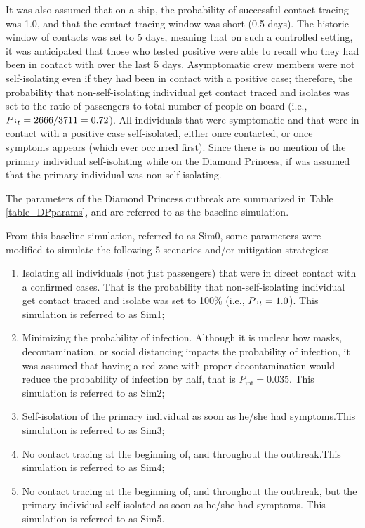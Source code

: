 \documentclass[sr]{drdc-report}
\def\Pinf{\ensuremath{P_\mathrm{inf}}}
\def\Pit{\ensuremath{P_{{\hspace{0.25em}}^\mathrm{i}t}}}
\begin{document}
It was also assumed that on a ship, the probability of successful contact tracing was 1.0, and that the contact tracing window was short (0.5 days). The historic window of contacts was set to 5 days, meaning that on such a controlled setting, it was anticipated that those who tested positive were able to recall who they had been in contact with over the last 5 days. Asymptomatic crew members were not self-isolating even if they had been in contact with a positive case; therefore, the probability that non-self-isolating individual get contact traced and isolates was set to the ratio of passengers to total number of people on board (i.e., $\Pit = 2666/3711 = 0.72$).  All individuals that were symptomatic and that were in contact with a positive case self-isolated, either once contacted, or once symptoms appears (which ever occurred first). Since there is no mention of the primary individual self-isolating while on the Diamond Princess, if was assumed that the primary individual was non-self isolating. 

The parameters of the Diamond Princess outbreak are summarized in Table \ref{table_DPparams}, and are referred to as the baseline simulation. 

From this baseline simulation, referred to as Sim0, some parameters were modified to simulate the following 5 scenarios and/or mitigation strategies:
\begin{enumerate}
\item Isolating all individuals (not just passengers) that were in direct contact with a confirmed cases. That is the probability that non-self-isolating individual get contact traced and isolate was set to 100\% (i.e., $\Pit = 1.0$). This simulation is referred to as Sim1;
\item Minimizing the probability of infection. Although it is unclear how masks, decontamination, or social distancing impacts the probability of infection, it was assumed that having a red-zone with proper decontamination would reduce the probability of infection by half, that is $\Pinf = 0.035$. This simulation is referred to as Sim2;
\item Self-isolation of the primary individual as soon as he/she had symptoms.This simulation is referred to as Sim3;
\item No contact tracing at the beginning of, and throughout the outbreak.This simulation is referred to as Sim4;
\item No contact tracing at the beginning of, and throughout the outbreak, but the primary individual self-isolated as soon as he/she had symptoms. This simulation is referred to as Sim5. 
\end{enumerate}
\end{document}
